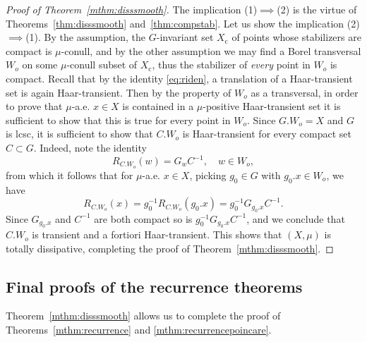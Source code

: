 \documentclass{amsart}
\numberwithin{equation}{subsection}
\begin{document}
\begin{proof}[Proof of Theorem~\ref{mthm:disssmooth}]
The implication (1)\(\implies\)(2) is the virtue of Theorems~\ref{thm:disssmooth} and~\ref{thm:compstab}. Let us show the implication (2)\(\implies\)(1). By the assumption, the \(G\)-invariant set \(X_{\mathrm{c}}\) of points whose stabilizers are compact is \(\mu\)-conull, and by the other assumption we may find a Borel transversal \(W_{o}\) on some \(\mu\)-conull subset of \(X_{\mathrm{c}}\), thus the stabilizer of \emph{every} point in \(W_{o}\) is compact. Recall that by the identity \eqref{eq:riden}, a translation of a Haar-transient set is again Haar-transient. Then by the property of \(W_{o}\) as a transversal, in order to prove that \(\mu\)-a.e. \(x\in X\) is contained in a \(\mu\)-positive Haar-transient set it is sufficient to show that this is true for every point in \(W_{o}\). Since \(G.W_{o}=X\) and \(G\) is lcsc, it is sufficient to show that \(C.W_{o}\) is Haar-transient for every compact set \(C\subset G\). Indeed, note the identity
\[R_{C.W_{o}}\left(w\right)=G_{w}C^{-1},\quad w\in W_{o},\]
from which it follows that for \(\mu\)-a.e. \(x\in X\), picking \(g_{0}\in G\) with \(g_{0}.x\in W_{o}\), we have
\[R_{C.W_{o}}\left(x\right)=g_{0}^{-1}R_{C.W_{o}}\left(g_{0}.x\right)=g_0^{-1}G_{g_{0}.x}C^{-1}.\]
Since \(G_{g_{0}.x}\) and \(C^{-1}\) are both compact so is \(g_{0}^{-1}G_{g_{0}.x}C^{-1}\), and we conclude that \(C.W_{o}\) is transient and a fortiori Haar-transient. This shows that \(\left(X,\mu\right)\) is totally dissipative, completing the proof of Theorem~\ref{mthm:disssmooth}.
\end{proof}

\subsection{Final proofs of the recurrence theorems}
\label{sct:finalrecurrence}

Theorem~\ref{mthm:disssmooth} allows us to complete the proof of Theorems~\ref{mthm:recurrence} and \ref{mthm:recurrencepoincare}.
\end{document}
